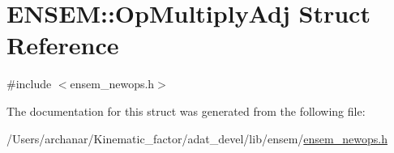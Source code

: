 \hypertarget{structENSEM_1_1OpMultiplyAdj}{}\section{E\+N\+S\+EM\+:\+:Op\+Multiply\+Adj Struct Reference}
\label{structENSEM_1_1OpMultiplyAdj}


{\ttfamily \#include $<$ensem\+\_\+newops.\+h$>$}



The documentation for this struct was generated from the following file\+:\begin{DoxyCompactItemize}
\item 
/\+Users/archanar/\+Kinematic\+\_\+factor/adat\+\_\+devel/lib/ensem/\mbox{\hyperlink{lib_2ensem_2ensem__newops_8h}{ensem\+\_\+newops.\+h}}\end{DoxyCompactItemize}
